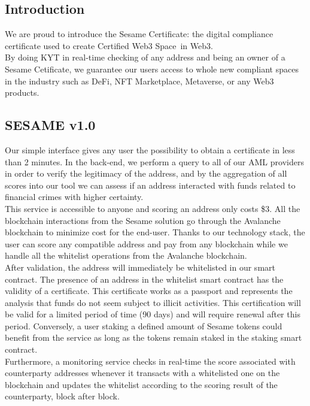 ﻿\documentclass[a4paper]{article}
\begin{document}
\subsection{Introduction}
We are proud to introduce the Sesame Certificate: the digital compliance certificate used to create Certified Web3 Space\texttrademark\ in Web3. \\

By doing KYT in real-time checking of any address and being an owner of a Sesame Cetificate, we guarantee our users access to whole new compliant spaces in the industry such as DeFi, NFT Marketplace, Metaverse, or any Web3 products.

\subsection{SESAME v1.0}
Our simple interface gives any user the possibility to obtain a certificate in less than 2 minutes. In the back-end, we perform a query to all of our AML providers in order to verify the legitimacy of the address, and by the aggregation of all scores into our tool we can assess if an address interacted with funds related to financial crimes with higher certainty. \\

This service is accessible to anyone and scoring an address only costs \$3. All the blockchain interactions from the Sesame solution go through the Avalanche blockchain to minimize cost for the end-user. Thanks to our technology stack, the user can score any compatible address and pay from any blockchain while we handle all the whitelist operations from the Avalanche blockchain. \\

After validation, the address will immediately be whitelisted in our smart contract. The presence of an address in the whitelist smart contract has the validity of a certificate. This certificate works as a passport and represents the analysis that funds do not seem subject to illicit activities. This certification will be valid for a limited period of time (90 days) and will require renewal after this period. Conversely, a user staking a defined amount of Sesame tokens could benefit from the service as long as the tokens remain staked in the staking smart contract. \\

Furthermore, a monitoring service checks in real-time the score associated with counterparty addresses whenever it transacts with a whitelisted one on the blockchain and updates the whitelist according to the scoring result of the counterparty, block after block. \\
\end{document}
